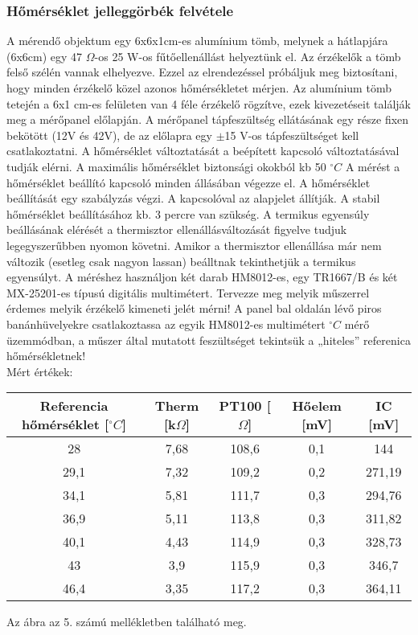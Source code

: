 \documentclass[10pt,a4paper]{article}
\begin{document}
\subsubsection{Hőmérséklet jelleggörbék felvétele}
A mérendő objektum egy 6x6x1cm-es alumínium tömb, melynek
a hátlapjára (6x6cm) egy 47 $\Omega$-os 25 W-os fűtőellenállást
helyeztünk el.
Az érzékelők a tömb felső szélén vannak elhelyezve. Ezzel az
elrendezéssel próbáljuk meg biztosítani, hogy minden érzékelő
közel azonos hőmérsékletet mérjen.
Az alumínium tömb tetején a 6x1 cm-es felületen van 4 féle
érzékelő rögzítve, ezek kivezetéseit találják meg a mérőpanel
előlapján.
A mérőpanel tápfeszültség ellátásának egy része fixen bekötött
(12V és 42V), de az előlapra egy $\pm$15 V-os tápfeszültséget kell
csatlakoztatni.
A hőmérséklet változtatását a beépített kapcsoló változtatásával
tudják elérni.
A maximális hőmérséklet biztonsági okokból kb 50 $^{\circ}C$
A mérést a hőmérséklet beállító kapcsoló minden állásában
végezze el. A hőmérséklet beállítását egy szabályzás végzi. A
kapcsolóval az alapjelet állítják. A stabil hőmérséklet
beállításához kb. 3 percre van szükség. A termikus egyensúly
beállásának elérését a thermisztor ellenállásváltozását figyelve
tudjuk legegyszerűbben nyomon követni. Amikor a thermisztor
ellenállása már nem változik (esetleg csak nagyon lassan)
beálltnak tekinthetjük a termikus egyensúlyt.
A méréshez használjon két darab HM8012-es, egy TR1667/B és
két MX-25201-es típusú digitális multimétert.
Tervezze meg melyik műszerrel érdemes melyik érzékelő kimeneti
jelét mérni! A panel bal oldalán lévő piros banánhüvelyekre csatlakoztassa az
egyik HM8012-es multimétert $^{\circ}C$ mérő üzemmódban, a műszer
által mutatott feszültséget tekintsük a „hiteles” referenica
hőmérsékletnek!
$$$$Mért értékek:$$$$\begin{tabular}{|c|c|c|c|c|}
\hline 
Referencia hőmérséklet [$^{\circ}C$] & Therm [k$\Omega$] & PT100 [$\Omega$] & Hőelem [mV] & IC [mV] \\ 
\hline 
28 & 7,68 & 108,6 & 0,1 & 144 \\ 
\hline 
29,1 & 7,32 & 109,2 & 0,2 & 271,19 \\ 
\hline 
34,1 & 5,81 & 111,7 & 0,3 & 294,76 \\ 
\hline 
36,9 & 5,11 & 113,8 & 0,3 & 311,82 \\ 
\hline 
40,1 & 4,43 & 114,9 & 0,3 & 328,73 \\ 
\hline 
43 & 3,9 & 115,9 & 0,3 & 346,7 \\ 
\hline 
46,4 & 3,35 & 117,2 & 0,3 & 364,11 \\ 
\hline 
\end{tabular} $$$$Az ábra az 5. számú mellékletben található meg.
\end{document}
